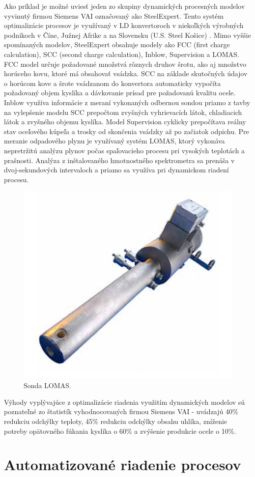 \documentclass[]{tukediphc}
\begin{document}
Ako príklad je možné uviesť jeden zo skupiny dynamických procesných modelov vyvinutý firmou Siemens VAI označovaný ako SteelExpert. Tento systém optimalizácie procesov je využívaný v LD konvertoroch v niekoľkých výrobných podnikoch v Číne, Južnej Afrike a na Slovensku (U.S. Steel Košice) \citep{siemensVAI}. Mimo vyššie spomínaných modelov, SteelExpert obsahuje modely ako FCC (first charge calculation), SCC (second charge calculation), Inblow, Supervision a LOMAS. FCC model určuje požadované množstvá rôznych druhov šrotu, ako aj množstvo horúceho kovu, ktoré má obsahovať vsádzka. SCC na základe skutočných údajov o horúcom kove a šrote vsádzanom do konvertora automaticky vypočíta požadovaný objem kyslíka a dávkovanie prísad pre požadovanú kvalitu ocele. Inblow využíva informácie z meraní vykonaných odbernou sondou priamo z tavby na vylepšenie modelu SCC prepočtom zvyšných vyhrievacích látok, chladiacich látok a zvyšného objemu kyslíka. Model Supervision cyklicky prepočítava reálny stav oceľového kúpeľa a trosky od skončenia vsádzky až po začiatok odpichu. Pre meranie odpadového plynu je využívaný systém LOMAS, ktorý vykonáva nepretržitú analýzu plynov počas spaľovacieho procesu pri vysokých teplotách a prašnosti. Analýza z inštalovaného hmotnostného spektrometra sa prenáša v dvoj-sekundových intervaloch a priamo sa využíva pri dynamickom riadení procesu. \newline

\begin{figure}[h!]
	\centering
	\includegraphics[width=.4\textwidth,angle=0]{figures/lomas-probe.jpg}
	\caption{Sonda LOMAS.}
\end{figure}

Výhody vyplývajúce z optimalizácie riadenia využitím dynamických modelov sú poznateľné zo štatistík vyhodnocovaných firmou Siemens VAI - uvádzajú 40\% redukciu odchýlky teploty, 45\% redukciu odchýlky obsahu uhlíka, zníženie potreby opätovného fúkania kyslíka o 60\% a zvýšenie produkcie ocele o 10\%.

\section{Automatizované riadenie procesov}
\end{document}
